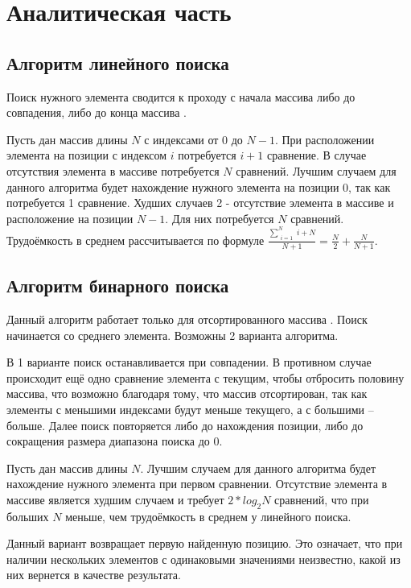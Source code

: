 \chapter{Аналитическая часть}

\section{Алгоритм линейного поиска}

Поиск нужного элемента сводится к проходу с начала массива либо до совпадения, либо до конца массива \cite{search}. 

Пусть дан массив длины $N$ с индексами от 0 до $N - 1$. При расположении элемента на позиции с индексом $i$ потребуется $i + 1$ сравнение. В случае отсутствия элемента в массиве потребуется $N$ сравнений. Лучшим случаем для данного алгоритма будет нахождение нужного элемента на позиции 0, так как потребуется 1 сравнение. Худших случаев 2 - отсутствие элемента в массиве и расположение на позиции $N - 1$. Для них потребуется $N$ сравнений. Трудоёмкость в среднем рассчитывается по формуле $\frac{\sum_{\substack{i=1}}^N i + N}{N + 1} = \frac{N}{2} + \frac{N}{N + 1}$.

\section{Алгоритм бинарного поиска}

Данный алгоритм работает только для отсортированного массива \cite{search}. Поиск начинается со среднего элемента. Возможны 2 варианта алгоритма.

В 1 варианте поиск останавливается при совпадении. В противном случае происходит ещё одно сравнение элемента с текущим, чтобы отбросить половину массива, что возможно благодаря тому, что массив отсортирован, так как элементы с меньшими индексами будут меньше текущего, а с большими -- больше. Далее поиск повторяется либо до нахождения позиции, либо до сокращения размера диапазона поиска до 0.

Пусть дан массив длины $N$. Лучшим случаем для данного алгоритма будет нахождение нужного элемента при первом сравнении. Отсутствие элемента в массиве является худшим случаем и требует $2 * log_2{N}$ сравнений, что при больших $N$ меньше, чем трудоёмкость в среднем у линейного поиска.

Данный вариант возвращает первую найденную позицию. Это означает, что при наличии нескольких элементов с одинаковыми значениями неизвестно, какой из них вернется в качестве результата.

